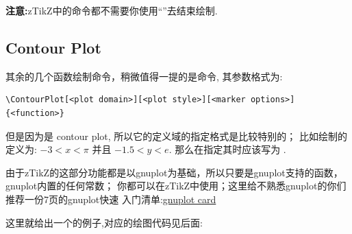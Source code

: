\begin{center}
\end{center}

\begin{leftbar}
\noindent \textbf{注意:}zTikZ中的命令都不需要你使用``\cmd{;}''去结束绘制.
\end{leftbar}


\subsection{Contour Plot}
其余的几个函数绘制命令，稍微值得一提的是命令\cmd{\ContourPlot}\index{\cmd{\ContourPlot}}, 其参数格式为:

\begin{verbatim}
\ContourPlot[<plot domain>][<plot style>][<marker options>]{<function>}
\end{verbatim}

但是因为是 contour plot, 所以它的定义域的指定格式是比较特别的； 比如绘制的定义为:
$-3<x<\pi$ 并且 $-1.5<y<e$. 那么在指定其时应该写为
.

\begin{leftbar}
\noindent 由于zTikZ的这部分功能都是以gnuplot为基础，所以只要是gnuplot支持的函数，gnuplot内置的任何常数；
你都可以在zTikZ中使用；这里给不熟悉gnuplot的你们推荐一份7页的gnuplot快速
入门清单:\href{http://www.gnuplot.info/docs_4.0/gpcard.pdf}{gnuplot card}
\end{leftbar}

这里就给出一个\cmd{\ContourPlot}的例子,对应的绘图代码见后面:

\begin{center}
\end{center}

